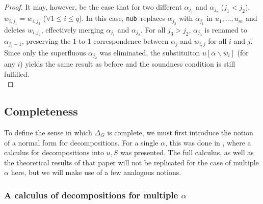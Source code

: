 \documentclass[a4paper, 11pt]{report}
\newcommand{\nub}{\texttt{nub}}
\newtheorem{definition}{Definition}
\begin{document}
\begin{proof}
It may, however, be the case that for two different $\alpha_{j_1}$ and $\alpha_{j_2}$ ($j_1 < j_2$), $\bar{w}_{i,j_1} = \bar{w}_{i,j_2}$ ($\forall 1 \leq i \leq q$). In this case, \nub\ replaces $\alpha_{j_2}$ with $\alpha_{j_1}$ in $u_1,\dots,u_m$ and deletes $w_{i,j_2}$, effectively merging $\alpha_{j_1}$ and $\alpha_{j_2}$. For all $j_3 > j_2$, $\alpha_{j_3}$ is renamed to $\alpha_{j_3 - 1}$, preserving the 1-to-1 correspondence between $\alpha_j$ and $w_{i,j}$ for all $i$ and $j$. Since only the superfluous $\alpha_{j_2}$ was eliminated, the substituiton $u[\bar{\alpha}\backslash \bar{w}_i]$ (for any $i$) yields the same result as before and the soundness condition is still fulfilled.\\
\end{proof}



\subsection{Completeness}

To define the sense in which $\Delta_G$ is complete, we must first introduce the notion of a normal form for decompositions. For a single $\alpha$, this was done in \cite[Sect. 4]{Hetzl2012}, where a calculus for decompositions into $u,S$ was presented. The full calculus, as well as the theoretical results of that paper will not be replicated for the case of multiple $\alpha$ here, but we will make use of a few analogous notions.

\subsubsection{A calculus of decompositions for multiple $\alpha$}

\iffalse
\begin{definition}
  \textbf{Decomposition and substitution.}
  A term $u$ and a list of vectors $S$ are a decomposition and $u \circ S$ is a substitution for a set of terms $\{t_1,\dots,t_n\}$ if
  $$
    \{t_1,\dots,t_n\} =
    u \circ S =
    \{ u[\bar{\alpha} \backslash s_{i,i}, \dots, s_{q,i} |\ 1 \leq i \leq n]  \}
  $$
  where $\bar{\alpha} = (\alpha_1,\dots,\alpha_q)$, $u[\bar{\alpha}\backslash(s_{1,j},\dots,s_{q,j})] = u[\alpha_1\backslash s_{1,j},\dots,\alpha_q\backslash s_{q,j}]$, s.t.
  \begin{enumerate}
    \item $S$ does not contain any $\alpha_i$ and
    \item the variables occurring in $u$ are numbered $\alpha_1,\dots,\alpha_q$ left-to-right.
  \end{enumerate}
\end{definition}
\fi
\end{document}
